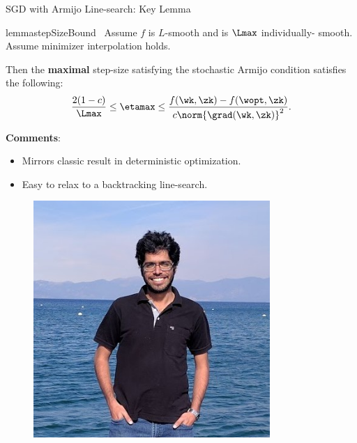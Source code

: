 \documentclass[mathserif,notheorems, hyperref={colorlinks, citecolor=blue, urlcolor=blue, linkcolor=blue}]{beamer}
\def\\{}%
\begin{document}
    \begin{frame}{SGD with Armijo Line-search: Key Lemma}
        \vspace{-2ex}
        \begin{minipage}[t]{0.82\textwidth}
        \vspace{-1.45ex} 
            \begin{restatable}{lemma}{stepSizeBound}~\label{lemma:step-size-bound}
                Assume \( f \) is \( L \)-smooth and \oracle{} is \( \Lmax \) individually- smooth.
                Assume minimizer interpolation holds.\\

                Then the \textbf{maximal} step-size satisfying the stochastic Armijo condition satisfies the following: 
                \[ \frac{2 (1-c)}{\Lmax} \leq \etamax \leq \frac{f(\wk, \zk) - f(\wopt, \zk)}{c \norm{\grad(\wk, \zk)}^2}. \]
            \end{restatable}
            
            \textbf{Comments}:
            \begin{itemize}
                \item Mirrors classic result in deterministic optimization.  
                \item Easy to relax to a backtracking line-search.
            \end{itemize}

       \end{minipage} 
       \begin{minipage}[t]{0.15\textwidth}
            \begin{figure}[t]
                \centering
                \includegraphics[width=0.8\textwidth]{collaborators/sharan}


\end{figure}
\end{minipage}
\end{frame}
\end{document}
